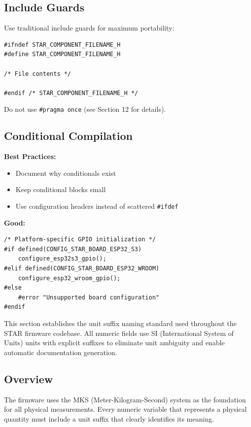 \subsection{Include Guards}

Use traditional include guards for maximum portability:

\begin{verbatim}
#ifndef STAR_COMPONENT_FILENAME_H
#define STAR_COMPONENT_FILENAME_H

/* File contents */

#endif /* STAR_COMPONENT_FILENAME_H */
\end{verbatim}

Do not use \texttt{\#pragma once} (see Section 12 for details).

\subsection{Conditional Compilation}

\textbf{Best Practices:}
\begin{itemize}
    \item Document why conditionals exist
    \item Keep conditional blocks small
    \item Use configuration headers instead of scattered \texttt{\#ifdef}
\end{itemize}

\textbf{Good:}
\begin{verbatim}
/* Platform-specific GPIO initialization */
#if defined(CONFIG_STAR_BOARD_ESP32_S3)
    configure_esp32s3_gpio();
#elif defined(CONFIG_STAR_BOARD_ESP32_WROOM)
    configure_esp32_wroom_gpio();
#else
    #error "Unsupported board configuration"
#endif
\end{verbatim}


This section establishes the unit suffix naming standard used throughout the STAR firmware codebase. All numeric fields use SI (International System of Units) units with explicit suffixes to eliminate unit ambiguity and enable automatic documentation generation.

\subsection{Overview}

The firmware uses the MKS (Meter-Kilogram-Second) system as the foundation for all physical measurements. Every numeric variable that represents a physical quantity must include a unit suffix that clearly identifies its meaning.

